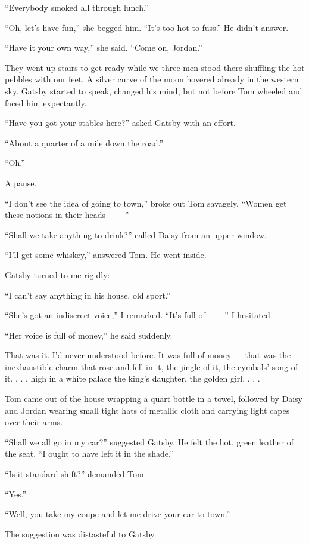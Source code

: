 \documentclass{znotebook}
\begin{document}
``Everybody smoked all through lunch.''

``Oh, let's have fun,'' she begged him. ``It's too hot to fuss.'' He didn't answer.

``Have it your own way,'' she said. ``Come on, Jordan.''

They went up-stairs to get ready while we three men stood there shuffling the hot pebbles with our feet. A silver curve of the moon hovered already in the western sky. Gatsby started to speak, changed his mind, but not before Tom wheeled and faced him expectantly.

``Have you got your stables here?'' asked Gatsby with an effort.

``About a quarter of a mile down the road.''

``Oh.''

A pause.

``I don't see the idea of going to town,'' broke out Tom savagely. ``Women get these notions in their heads ——''

``Shall we take anything to drink?'' called Daisy from an upper window.

``I'll get some whiskey,'' answered Tom. He went inside.

Gatsby turned to me rigidly:

``I can't say anything in his house, old sport.''

``She's got an indiscreet voice,'' I remarked. ``It's full of ——'' I hesitated.

``Her voice is full of money,'' he said suddenly.

That was it. I'd never understood before. It was full of money — that was the inexhaustible charm that rose and fell in it, the jingle of it, the cymbals' song of it. . . . high in a white palace the king's daughter, the golden girl. . . .

Tom came out of the house wrapping a quart bottle in a towel, followed by Daisy and Jordan wearing small tight hats of metallic cloth and carrying light capes over their arms.

``Shall we all go in my car?'' suggested Gatsby. He felt the hot, green leather of the seat. ``I ought to have left it in the shade.''

``Is it standard shift?'' demanded Tom.

``Yes.''

``Well, you take my coupe and let me drive your car to town.''

The suggestion was distasteful to Gatsby.
\end{document}
